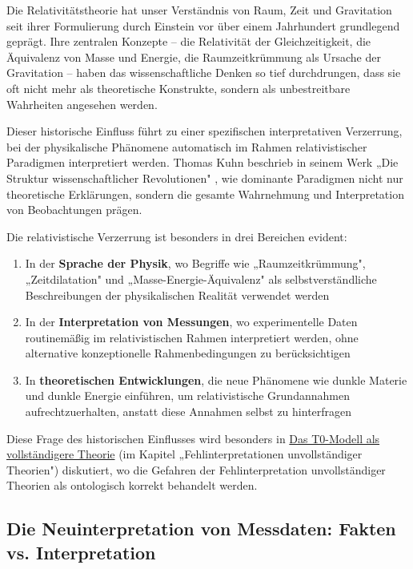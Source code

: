 \documentclass[12pt,a4paper]{article}
\begin{document}
	Die Relativitätstheorie hat unser Verständnis von Raum, Zeit und Gravitation seit ihrer Formulierung durch Einstein vor über einem Jahrhundert grundlegend geprägt. Ihre zentralen Konzepte – die Relativität der Gleichzeitigkeit, die Äquivalenz von Masse und Energie, die Raumzeitkrümmung als Ursache der Gravitation – haben das wissenschaftliche Denken so tief durchdrungen, dass sie oft nicht mehr als theoretische Konstrukte, sondern als unbestreitbare Wahrheiten angesehen werden.
	
	Dieser historische Einfluss führt zu einer spezifischen interpretativen Verzerrung, bei der physikalische Phänomene automatisch im Rahmen relativistischer Paradigmen interpretiert werden. Thomas Kuhn beschrieb in seinem Werk „Die Struktur wissenschaftlicher Revolutionen" \cite{kuhn1962}, wie dominante Paradigmen nicht nur theoretische Erklärungen, sondern die gesamte Wahrnehmung und Interpretation von Beobachtungen prägen.
	
	Die relativistische Verzerrung ist besonders in drei Bereichen evident:
	
	\begin{enumerate}
		\item In der \textbf{Sprache der Physik}, wo Begriffe wie „Raumzeitkrümmung", „Zeitdilatation" und „Masse-Energie-Äquivalenz" als selbstverständliche Beschreibungen der physikalischen Realität verwendet werden
		
		\item In der \textbf{Interpretation von Messungen}, wo experimentelle Daten routinemäßig im relativistischen Rahmen interpretiert werden, ohne alternative konzeptionelle Rahmenbedingungen zu berücksichtigen
		
		\item In \textbf{theoretischen Entwicklungen}, die neue Phänomene wie dunkle Materie und dunkle Energie einführen, um relativistische Grundannahmen aufrechtzuerhalten, anstatt diese Annahmen selbst zu hinterfragen
	\end{enumerate}
	
	Diese Frage des historischen Einflusses wird besonders in \href{https://github.com/jpascher/T0-Time-Mass-Duality/tree/main/2/pdf/English/T0-ModelAsCompleteTheory_En.pdf}{Das T0-Modell als vollständigere Theorie} (im Kapitel „Fehl\-interpretationen unvollständiger Theorien") diskutiert, wo die Gefahren der Fehlinterpretation unvollständiger Theorien als ontologisch korrekt behandelt werden.
	
	\subsection{Die Neuinterpretation von Messdaten: Fakten vs. Interpretation}
	\label{subsec:data_reinterpretation}
	
\end{document}
